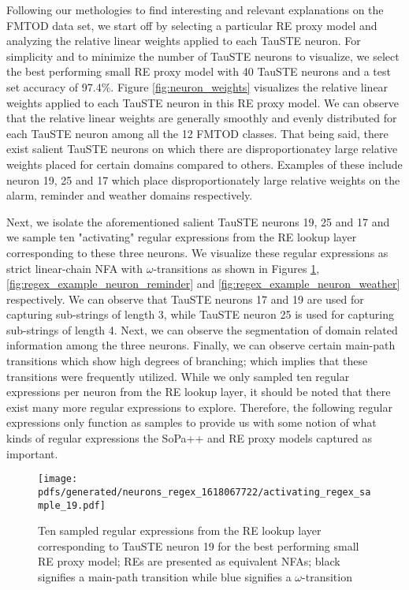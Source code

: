 Following our methologies to find interesting and relevant explanations on the
FMTOD data set, we start off by selecting a particular RE proxy model and
analyzing the relative linear weights applied to each TauSTE neuron. For
simplicity and to minimize the number of TauSTE neurons to visualize, we select
the best performing small RE proxy model with 40 TauSTE neurons and a test set
accuracy of 97.4$\%$. Figure \ref{fig:neuron_weights} visualizes the relative
linear weights applied to each TauSTE neuron in this RE proxy model. We can
observe that the relative linear weights are generally smoothly and evenly
distributed for each TauSTE neuron among all the 12 FMTOD classes. That being
said, there exist salient TauSTE neurons on which there are disproportionatey
large relative weights placed for certain domains compared to others. Examples
of these include neuron 19, 25 and 17 which place disproportionately large
relative weights on the alarm, reminder and weather domains respectively.

Next, we isolate the aforementioned salient TauSTE neurons 19, 25 and 17 and we
sample ten "activating" regular expressions from the RE lookup layer
corresponding to these three neurons. We visualize these regular expressions as
strict linear-chain NFA with $\omega$-transitions as shown in Figures
\ref{fig:regex_example_neuron_alarm}, \ref{fig:regex_example_neuron_reminder}
and \ref{fig:regex_example_neuron_weather} respectively. We can observe that
TauSTE neurons 17 and 19 are used for capturing sub-strings of length 3, while
TauSTE neuron 25 is used for capturing sub-strings of length 4. Next, we can
observe the segmentation of domain related information among the three neurons.
Finally, we can observe certain main-path transitions which show high degrees of
branching; which implies that these transitions were frequently utilized. While
we only sampled ten regular expressions per neuron from the RE lookup layer, it
should be noted that there exist many more regular expressions to explore.
Therefore, the following regular expressions only function as samples to provide
us with some notion of what kinds of regular expressions the SoPa++ and RE proxy
models captured as important.

\newpage

\begin{figure}[t!]
  \centering \texttt{[image: pdfs/generated/neurons\_regex\_1618067722/activating\_regex\_sample\_19.pdf]}
  \caption{Ten sampled regular expressions from the RE lookup layer
    corresponding to TauSTE neuron 19 for the best performing small RE proxy
    model; REs are presented as equivalent NFAs; black signifies a
    main-path transition while blue signifies a $\omega$-transition}
  \label{fig:regex_example_neuron_alarm}
\end{figure}

